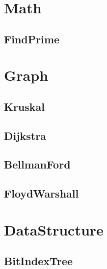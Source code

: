 \section{Math}
    \subsection{FindPrime}
        
\section{Graph}
    \subsection{Kruskal}
        
    \subsection{Dijkstra}
        
    \subsection{BellmanFord}
        
    \subsection{FloydWarshall}
        
\section{DataStructure}
    \subsection{BitIndexTree}
        
    
